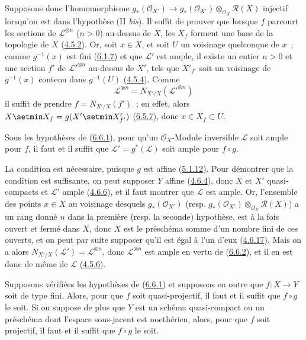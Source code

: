 Supposons donc l'homomorphisme
$g_*(\mathcal{O}_{X'})\to
g_*(\mathcal{O}_{X'})\otimes_{\mathcal{O}_X}\mathcal{R}(X)$ injectif
lorsqu'on est dans l'hypothèse (II \emph{bis}). Il suffit de prouver que
lorsque $f$ parcourt les sections de $\mathcal{L}^{\otimes n}$ ($n>0$)
au-dessus de $X$, les $X_f$ forment une base de la topologie de $X$
(\hyperref[II.4.5.2-fr]{4.5.2}). Or, soit $x\in X$, et soit $U$ un voisinage
quelconque de $x$~; comme $g^{-1}(x)$ est fini
(\hyperref[II.6.1.7-fr]{6.1.7}) et que $\mathcal{L}'$ est ample, il existe un
entier $n>0$ et une section $f'$ de ${\mathcal{L}'}^{\otimes n}$ au-dessus de
$X'$, tels que $X'_{f'}$ soit un voisinage de $g^{-1}(x)$ contenu dans
$g^{-1}(U)$ (\hyperref[II.4.5.4-fr]{4.5.4}). Comme
\[
\mathcal{L}^{\otimes n}=N_{X'/X}({\mathcal{L}'}^{\otimes n})
\]
il suffit de prendre $f=N_{X'/X}(f')$~; en effet, alors
$X\setmin X_f=g(X'\setmin X'_{f'})$ (\hyperref[II.6.5.7-fr]{6.5.7}), donc
$x\in X_f\subset U$.

\begin{corollary}[6.6.3]
\label{II.6.6.3-fr}
Sous les hypothèses de \textup{(\hyperref[II.6.6.1-fr]{6.6.1})}, pour qu'un
$\mathcal{O}_X$-Module inversible $\mathcal{L}$ soit ample pour $f$, il faut
et il suffit que $\mathcal{L}'=g^*(\mathcal{L})$ soit ample pour $f\circ g$.
\end{corollary}

La condition est nécessaire, puisque $g$ est affine
(\hyperref[II.5.1.12-fr]{5.1.12}). Pour démontrer que la condition est
suffisante, on peut supposer $Y$ affine (\hyperref[II.4.6.4-fr]{4.6.4}), donc
$X$ et $X'$ quasi-compacts et $\mathcal{L}'$ ample
(\hyperref[II.4.6.6-fr]{4.6.6}), et il faut montrer que $\mathcal{L}$ est
ample. Or, l'ensemble des points
$x\in X$ au voisinage desquels $g_*(\mathcal{O}_{X'})$ (resp.
$g_*(\mathcal{O}_{X'})\otimes_{\mathcal{O}_X}\mathcal{R}(X)$) a un rang
donné $n$ dans la première (resp. la seconde) hypothèse, est à la fois ouvert
et fermé dans $X$, donc $X$ est le préschéma somme d'un nombre fini de ces
ouverts, et on peut par suite supposer qu'il est égal à l'un d'eux
(\hyperref[II.4.6.17-fr]{4.6.17}). Mais on a alors
$N_{X'/X}(\mathcal{L}')=\mathcal{L}^{\otimes n}$, donc
$\mathcal{L}^{\otimes n}$ est ample en vertu de
(\hyperref[II.6.6.2-fr]{6.6.2}), et il en est donc de même de $\mathcal{L}$
(\hyperref[II.4.5.6-fr]{4.5.6}).

\begin{corollary}[6.6.4]
\label{II.6.6.4-fr}
Supposons vérifiées les hypothèses de
\textup{(\hyperref[II.6.6.1-fr]{6.6.1})} et supposons en outre que
$f:X\to Y$ soit de type fini. Alors, pour que $f$ soit quasi-projectif, il
faut et il suffit que $f\circ g$ le soit. Si on suppose de plus que $Y$ est
un schéma quasi-compact ou un préschéma dont l'espace sous-jacent est
noethérien, alors, pour que $f$ soit projectif, il faut et il suffit que
$f\circ g$ le soit.
\end{corollary}

